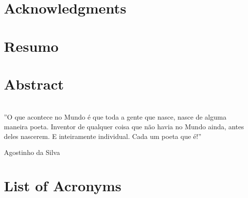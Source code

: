 \documentclass[a4paper, 11pt]{book}
\theoremstyle{definition}
\begin{document}
\frontmatter

\newpage\thispagestyle{empty}

\pagestyle{plain}



\chapter*{Acknowledgments}


\chapter*{Resumo}


\chapter*{Abstract}


\chapter*{}
\setlength\epigraphwidth{12cm}
\setlength\epigraphrule{0pt}
\makeatletter
{}
\makeatother
\vspace*{\fill}
\epigraph{''O que acontece no Mundo é que toda a gente que nasce, nasce de alguma maneira poeta. Inventor de qualquer coisa que não havia no Mundo ainda, antes deles nascerem. E inteiramente individual. Cada um poeta que é!''}
{Agostinho da Silva}
\vspace*{\fill}

\pagestyle{plain}
\tableofcontents

\chapter*{List of Acronyms}


\listoffigures

\listoftables

\mainmatter%
\end{document}
